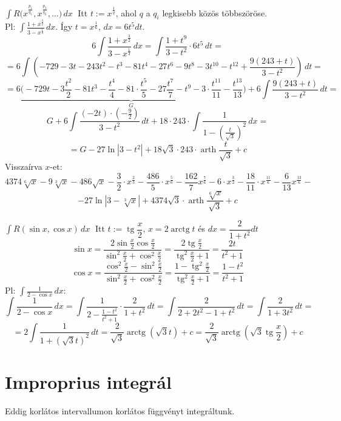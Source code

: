 \documentclass[a4paper,12pt,twoside]{book}
\DeclareMathOperator{\tg}{tg}
\DeclareMathOperator{\arctg}{arctg}
\DeclareMathOperator{\arth}{arth}
\theoremstyle{break}
\theoremstyle{plain}
\newcommand{\integ}[1]{\ensuremath{\int #1\, dx}}
\newcommand{\integDT}[1]{\ensuremath{\int #1\, dt}}
\begin{document}
\begin{list}{.}{\leftmargin=1.5em}
 \item $\boxed{\integ{R\big(x^{\frac{p_1}{q_1}}, x^{\frac{p_2}{q_2}}, \ldots\big)}}\;$ Itt $t := x^\frac{1}{q}$, ahol $q$ a $q_i$ legkisebb közös többszöröse.\\
  Pl: $\displaystyle \integ{\frac{1+x^\frac{3}{2}}{3-x^\frac{1}{3}}}$. Így $t = x^\frac{1}{6}$, $dx = 6t^5 dt$.
  \[6\integ{\frac{1+x^\frac{3}{2}}{3-x^\frac{1}{3}}} = \integDT{\frac{1+t^9}{3-t^2}\cdot 6t^5} = \]
  \[= 6\integDT{\left(-729 - 3 t - 243 t^2 - t^3 - 81 t^4 - 27 t^6 - 9 t^8 - 3 t^{10} - t^{12} + \frac{9 (243 + t)}{3 - t^2}\right)} = \]
  \[= \underbrace{6\Big(-729t - 3\frac{t^2}{2} - 81 t^3 - \frac{t^4}{4} - 81\cdot \frac{t^5}{5} - 27 \frac{t^7}{7} - t^9 - 3\cdot\frac{t^{11}}{11} - \frac{t^{13}}{13}\Big)}_{G} + 6\integDT{\frac{9 (243 + t)}{3 - t^2}} = \]
  \[G + 6\integDT{\frac{(-2t)\cdot(-\frac{9}{2})}{3 - t^2}} + 18\cdot 243\cdot\integ{\frac{1}{1-\left(\frac{t}{\sqrt{3}}\right)^2}} = \]
  \[= G - 27\ln |3 - t^2| + 18\sqrt{3}\cdot 243\cdot \arth\frac{t}{\sqrt{3}} +c \]
  Visszaírva $x$-et:
  \[4374\sqrt[6]{x} - 9\sqrt[3]{x} - 486 \sqrt{x} - \frac{3}{2}\cdot x^\frac{2}{3} - \frac{486}{5}\cdot x^\frac{5}{6} - \frac{162}{7} x^\frac{7}{6} - 6\cdot x^\frac{3}{2} - \frac{18}{11}\cdot x^\frac{11}{6} - \frac{6}{13}x^\frac{13}{6} -\]
  \[-27\ln |3 - \sqrt[3]{x}| + 4374\sqrt{3}\cdot \arth\frac{\sqrt[6]{x}}{\sqrt{3}} +c \]

 \item $\boxed{\integ{R(\sin x, \cos x)}}\;$ Itt $t := \tg \dfrac{x}{2}$, $x= 2\arctg t$ és $dx = \dfrac{2}{1+t^2}dt$
  \[\sin x = \frac{2\sin\frac{x}{2}\cos\frac{x}{2}}{\sin^2 \frac{x}{2}+\cos^2 \frac{x}{2}} = \frac{2\tg\frac{x}{2}}{\tg^2\frac{x}{2}+1} = \frac{2t}{t^2+1}\]
  \[\cos x = \frac{\cos^2\frac{x}{2}-\sin^2\frac{x}{2}}{\sin^2 \frac{x}{2}+\cos^2 \frac{x}{2}} = \frac{1-\tg^2\frac{x}{2}}{\tg^2\frac{x}{2}+1} = \frac{1-t^2}{t^2+1}\]
  Pl: $\displaystyle \integ{\frac{1}{2-\cos x}}$:
  \[\integ{\frac{1}{2-\cos x}} = \integDT{\frac{1}{2-\frac{1-t^2}{t^2+1}}\cdot \dfrac{2}{1+t^2}} = \integDT{\frac{2}{2+2t^2-1+t^2}} = \integDT{\frac{2}{1+3t^2}} = \]
  \[ = 2\integDT{\frac{1}{1+(\sqrt{3}t)^2}} = \frac{2}{\sqrt{3}}\arctg(\sqrt{3}t) + c = \frac{2}{\sqrt{3}}\arctg(\sqrt{3}\tg\frac{x}{2}) + c\]
\end{list}

\section{Improprius integrál}

Eddig korlátos intervallumon korlátos függvényt integráltunk.
\end{document}
